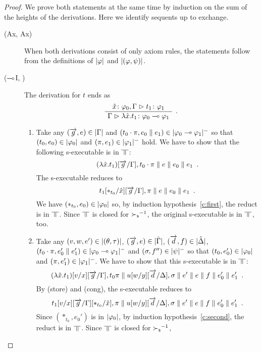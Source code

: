 \begin{proof}
 We prove both statements at the same time by induction on the sum of
 the heights of the derivations.  Here we identify sequents up to exchange.
  \begin{description}
  \item[(Ax, Ax)] When both derivations consist of only axiom rules,
       the statements follow from the definitions of $|{\varphi}|$ and
       $|{(\varphi,\psi)}|$.
   \item[($\multimap$I, \textminus)]
	The derivation for $t$ ends as
	\[
	\aseq{\tj{\hat x}{\phi_0},\G}{\tj{t_1}{\phi_1}}
	\useq{\G}{\tj{\lambda{\hat{x}}.t_1}{\phi_0\limp\phi_1}}
	\DisplayProof\enspace.
	\]
	\begin{enumerate}[label=\textit{(\arabic{*})}]
	 \item Take any
	       $(\overrightarrow g, e)\in|{\Gamma}|$
	       and
	       $(t_0\cdot\pi,e_0\parallel e_1)\in|{\varphi_0\multimap\varphi_1}|^-$
	       so that $(t_0,e_0)\in|{\varphi_0}|$ and
	       $(\pi,e_1)\in|{\varphi_1}|^-$ hold.
	       We have to show that the following s-executable is in
	       $\bbot$:
	       \[
	       (\lambda\hat x.t_1)[\overrightarrow g/\Gamma],
	       t_0\cdot\pi\parallel e\parallel e_0\parallel e_1\enspace.
	       \]
	       The s-executable reduces to
	       \[
		t_1[\ast_{t_0}/\hat x][\overrightarrow{g}/\Gamma],\pi\parallel{e}\parallel e_0\parallel{e_1}\enspace.
	       \]
	       We have $(\ast_{t_0}, e_0)\in|{\varphi_0}|$ so, by
	       induction hypothesis~\ref{c:first},
	       the reduct is in $\bbot$.
	       Since $\bbot$ is closed for ${\succ_{\mathsf s}}^{-1}$, the original
	       s-executable is in $\bbot$, too.
	 \item Take any $(v,w,e')\in|{(\theta,\tau)}|$,
	       $(\overrightarrow g, e)\in|{\hat{\Gamma}}|$,
	       $(\overrightarrow d, f)\in|{\hat{\Delta}}|$,
	       $(t_0\cdot\pi,e_0'\parallel e_1')\in|{\varphi_0\multimap\varphi_1}|^-$ and
	       $(\sigma,f'')\in|{\psi}|^-$ so that
	       $(t_0,e_0')\in|{\varphi_0}|$ and
	       $(\pi,e_1')\in|{\varphi_1}|^-$.
	       We have to show that this s-executable is in $\bbot$:
	       \[
	       (\lambda \hat x. t_1)[v/x][\overrightarrow{g}/\Gamma],t_0\pi\parallel
	       u[w/y][\overrightarrow{d}/\Delta],\sigma\parallel
	       e'\parallel {e}\parallel {f} \parallel{e_0'}\parallel{e_1'}\enspace.
	       \]
	       By (store) and (cong), the s-executable reduces to
	       \[
		t_1[v/x][\overrightarrow{g}/\Gamma][\ast_{t_0}/\hat x],\pi\parallel
	       u[w/y][\overrightarrow{d}/\Delta],\sigma\parallel
	       e'\parallel {e}\parallel {f} \parallel{e_0'}\parallel{e_1'}\enspace.
	       \]
	       Since $(\ast_{t_0},e_0')$ is in $|{\varphi_0}|$,
	       by induction hypothesis~\ref{c:second}, the reduct is in
	       $\bbot$.  Since $\bbot$ is closed for ${\succ_{\mathsf s}}^{-1}$,

\end{enumerate}
\end{description}
\end{proof}
